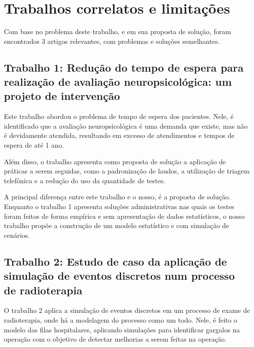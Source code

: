 \documentclass[
    12pt,
    openright,
    oneside,
    a4paper,
    english,
    brazil
]{abntex2}
\begin{document}
\section{Trabalhos correlatos e limitações}


Com base no problema deste trabalho, e em sua proposta de solução, foram encontrados 3 artigos relevantes, com problemas e soluções semelhantes.

\subsection{Trabalho 1: Redução do tempo de espera para realização de avaliação neuropsicológica: um projeto de intervenção \cite{Silva2023}}

Este trabalho abordou o problema de tempo de espera dos pacientes. Nele, é identificado que a avaliação neuropsicológica é uma demanda que existe, mas não é devidamente atendida, resultando em excesso de atendimentos e tempos de espera de até 1 ano.

Além disso, o trabalho apresenta como proposta de solução a aplicação de práticas a serem seguidas, como a padronização de laudos, a utilização de triagem telefônica e a redução do uso da quantidade de testes.

A principal diferença entre este trabalho e o nosso, é a proposta de solução. Enquanto o trabalho 1 apresenta soluções administrativas nas quais os testes foram feitos de forma empírica e sem apresentação de dados estatísticos, o nosso trabalho propõe a construção de um modelo estatístico e com simulação de cenários.

\subsection{Trabalho 2: Estudo de caso da aplicação de simulação de eventos discretos num processo de radioterapia \cite{Galves2022}}

O trabalho 2 aplica a simulação de eventos discretos em um processo de exame de radioterapia, onde há a modelagem do processo como um todo. Nele, é feito o modelo das filas hospitalares, aplicando simulações para identificar gargalos na operação com o objetivo de detectar melhorias a serem feitas na operação.
\end{document}

